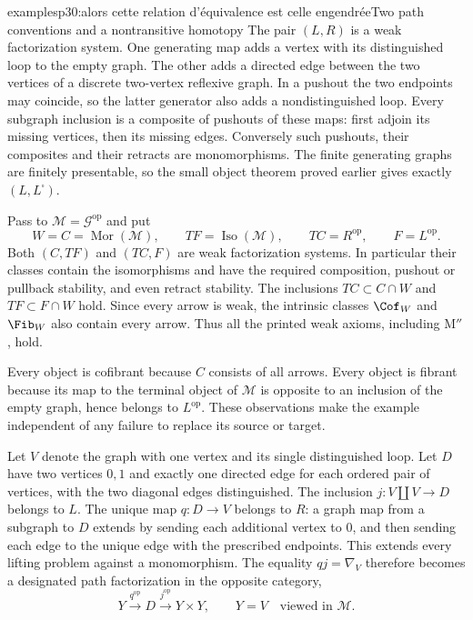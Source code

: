 \begin{dcomment}{examples}{p30:alors cette relation d'équivalence est celle engendrée}{Two path conventions and a nontransitive homotopy}
The pair $(L,R)$ is a weak factorization system. One generating map adds a vertex with its distinguished loop to the empty graph. The other adds a directed edge between the two vertices of a discrete two-vertex reflexive graph. In a pushout the two endpoints may coincide, so the latter generator also adds a nondistinguished loop. Every subgraph inclusion is a composite of pushouts of these maps: first adjoin its missing vertices, then its missing edges. Conversely such pushouts, their composites and their retracts are monomorphisms. The finite generating graphs are finitely presentable, so the small object theorem proved earlier gives exactly $(L,L^{\square})$.

Pass to $\mathcal M=\mathcal G^{\mathrm{op}}$ and put
\[
 W=C=\operatorname{Mor}(\mathcal M),\qquad TF=\operatorname{Iso}(\mathcal M),
 \qquad TC=R^{\mathrm{op}},\qquad F=L^{\mathrm{op}}.
\]
Both $(C,TF)$ and $(TC,F)$ are weak factorization systems. In particular their classes contain the isomorphisms and have the required composition, pushout or pullback stability, and even retract stability. The inclusions $TC\subset C\cap W$ and $TF\subset F\cap W$ hold. Since every arrow is weak, the intrinsic classes $\Cof_W$ and $\Fib_W$ also contain every arrow. Thus all the printed weak axioms, including $\text{M}''$, hold.

Every object is cofibrant because $C$ consists of all arrows. Every object is fibrant because its map to the terminal object of $\mathcal M$ is opposite to an inclusion of the empty graph, hence belongs to $L^{\mathrm{op}}$. These observations make the example independent of any failure to replace its source or target.

Let $V$ denote the graph with one vertex and its single distinguished loop. Let $D$ have two vertices $0,1$ and exactly one directed edge for each ordered pair of vertices, with the two diagonal edges distinguished. The inclusion $j:V\amalg V\to D$ belongs to $L$. The unique map $q:D\to V$ belongs to $R$: a graph map from a subgraph to $D$ extends by sending each additional vertex to $0$, and then sending each edge to the unique edge with the prescribed endpoints. This extends every lifting problem against a monomorphism. The equality $qj=\nabla_V$ therefore becomes a designated path factorization in the opposite category,
\[
 Y\xrightarrow{q^{\mathrm{op}}}D
     \xrightarrow{j^{\mathrm{op}}}Y\times Y,
 \qquad Y=V\quad\text{viewed in }\mathcal M.
\]


\end{dcomment}
